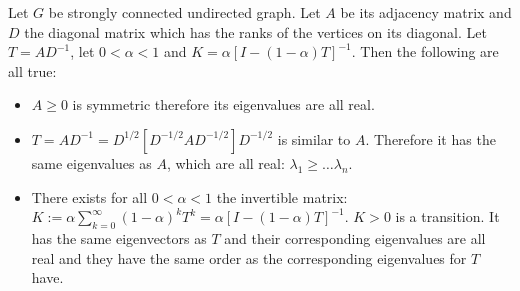 \begin{thm}
\label{Ax:thm:AKTcharacteristics}
Let $G$ be strongly connected undirected graph. Let $A$ be its adjacency matrix
and $D$ the diagonal matrix which has the ranks of the vertices on its diagonal.
Let $T = A D^{-1}$, let $0 \lt \alpha \lt 1$ and 
$K = \alpha [I - (1 - \alpha)T]^{-1}$. Then the following are all true:

\begin{itemize}

\item{}
$A \geq 0$ is symmetric therefore its eigenvalues are all real.

\item{}
$T = AD^{-1} = D^{1/2}[D^{-1/2}AD^{-1/2}]D^{-1/2}$ is similar to $A$. Therefore
it has the same eigenvalues as $A$, which are all real:
$\lambda_1 \geq \dots \lambda_n$.

\item{}
There exists for all $0 \lt \alpha \lt 1$ the invertible matrix: 
$K := \alpha \sum_{k=0}^{\infty} (1 - \alpha)^k T^k = \alpha [I - (1 -
\alpha)T]^{-1}$.
$K \gt 0$ is a transition. It has the same eigenvectors as $T$ and their
corresponding eigenvalues are all real and they have the same order as the
corresponding eigenvalues for $T$ have.
\end{itemize}
\end{thm}


